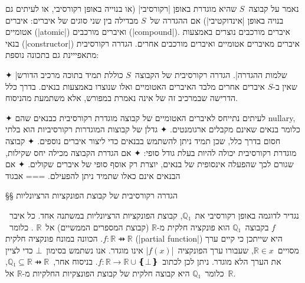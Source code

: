 נאמר על קבוצה~$S$ שהיא מוגדרת באופן \ע|רקורסיבי| (או בנוייה באופן רקורסיבי, או
לעיתים גם בנויה באופן \ע|אינדוקטיבי|) אם ההגדרה של~$S$ מבדילה בין שני סוגים של
איברים: איברים אטומיים (\E|atomic|) ואיברים מורכבים (\E|compound|). איברים
מורכבים נוצרים באמצעות בנאי (\E|constructor|) איברים מאיברים אטומיים ואיברים
מורכבים אחרים. הגדרה רקורסיבית מתאפייינת גם בתכונה נוספת: 
\begin{itemize}
  ✦ \ע|שלמות ההגדרה|. הגדרה רקורסיבית של הקבוצה~$S$ כוללת תמיד בתוכה מרכיב
  הדורש שאין ב-$S$ איברים אחרים מלבד האיברים האטומיים ואלו שנוצרו באמצעות בנאים.
  בדרך כלל הדרישה שבמרכיב זה של אינה נאמרת במפורש, אלא משתמעת מהניסוח.
  \end{itemize}

✦ לעיתים נתייחס לאיברים האטומיים של קבוצה מוגדרת רקורסיבית כבנאים שהם nullary,
כלומר בנאים שאינם מקבלים ארגומנטים.
✦ גדלן של קבוצות המוגדרות רקורסיביות הוא בלתי חסום בדרך כלל, שכן תמיד ניתן
להשתמש בבנאים כדי ליצור איברים נוספים.
✦ קבוצה מוגדרת רקורסיבית יכולה להיות בעלת גודל סופי:
✦ אם הגדרת הקבוצה מכילה יחס שקילות, שגורם לכך שהפעלה אינסופית של בנאים, יוצרת
רק אוסף סופי של איברים שקולים.
✦ אם הבנאים אינם כאלו שתמיד ניתן להפעילם.
===
{אבגוד}

§§ הגדרה רקורסיבית של קבוצת הפונקציות הרציונליות

נגדיר לדוגמה באופן רקורסיבי את~$ℚ₁$, קבוצת הפונקציות הרציונליות במשתנה אחד. כל
איבר~$f$ בקבוצה~$ℚ₁$ הוא פונקציה חלקית מ-$ℝ$ (קבוצת המספרים הממשיים) אל~$ℝ$ .
כלומר~$f:ℝ⇸ℝ$. הכוונה במונח פונקציה חלקית (\E|partial function|) היא שייתכן כי
קיים ערך מסויים~$ℝ∈x$, שעבורו ערך הפונקציה~\E|$f(x)$| אינו מוגדר. אנו נשתמש
בסימון~$⊥$ כדי לציין את הערך הלא מוגדר. ניתן לכן לכתוב~$f:ℝ→ℝ∪❴⊥❵$. בניסוח
אחר,~$ℚ₁⊆ℝ⇸ℝ$, כלומר~$ℚ₁$ היא קבוצה חלקית של קבוצת הפונצקיות החלקיות מ-$ℝ$
אל~$ℝ$.

